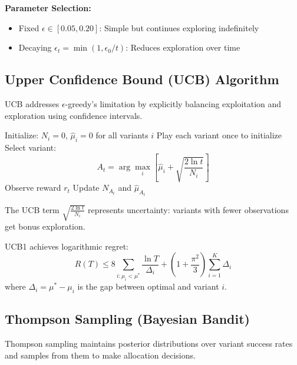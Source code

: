\textbf{Parameter Selection:}
\begin{itemize}
    \item Fixed $\epsilon \in [0.05, 0.20]$: Simple but continues exploring indefinitely
    \item Decaying $\epsilon_t = \min(1, \epsilon_0 / t)$: Reduces exploration over time
\end{itemize}

\subsection{Upper Confidence Bound (UCB) Algorithm}

UCB addresses $\epsilon$-greedy's limitation by explicitly balancing exploitation and exploration using confidence intervals.

\begin{algorithm}[H]
\caption{UCB1 Algorithm}
\begin{algorithmic}
\STATE Initialize: $N_i = 0$, $\hat{\mu}_i = 0$ for all variants $i$
\STATE Play each variant once to initialize
    \STATE Select variant:
    \begin{equation*}
    A_t = \arg\max_i \left[ \hat{\mu}_i + \sqrt{\frac{2 \ln t}{N_i}} \right]
    \end{equation*}
    \STATE Observe reward $r_t$
    \STATE Update $N_{A_t}$ and $\hat{\mu}_{A_t}$
\ENDFOR
\end{algorithmic}
\end{algorithm}

The UCB term $\sqrt{\frac{2 \ln t}{N_i}}$ represents uncertainty: variants with fewer observations get bonus exploration.

\begin{theorem}[Auer et al., 2002]
UCB1 achieves logarithmic regret:
\begin{equation}
R(T) \leq 8 \sum_{i: \mu_i < \mu^*} \frac{\ln T}{\Delta_i} + \left(1 + \frac{\pi^2}{3}\right) \sum_{i=1}^K \Delta_i
\end{equation}
where $\Delta_i = \mu^* - \mu_i$ is the gap between optimal and variant $i$.
\end{theorem}

\subsection{Thompson Sampling (Bayesian Bandit)}

Thompson sampling maintains posterior distributions over variant success rates and samples from them to make allocation decisions.

